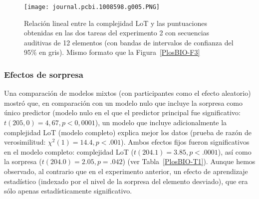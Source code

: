 \begin{figure}[t!]
   \texttt{[image: journal.pcbi.1008598.g005.PNG]}
   \centering
   \caption{Relación lineal entre la complejidad LoT y las puntuaciones obtenidas en las dos tareas del experimento 2 con secuencias auditivas de 12 elementos (con bandas de intervalos de confianza del 95\% en gris). Mismo formato que la Figura~\ref{PlosBIO-F3}}
   \label{PlosBIO-F5}
\end{figure}

\subsubsection*{Efectos de sorpresa}

Una comparación de modelos mixtos (con participantes como el efecto aleatorio)  mostró que, en comparación con un modelo nulo que incluye la sorpresa como único predictor (modelo nulo en el que el predictor principal fue significativo: $t (205,0) = 4,67, p <0,0001$), un modelo que incluye adicionalmente la complejidad LoT (modelo completo) explica mejor los datos (prueba de razón de verosimilitud: $\chi^2(1) = 14.4, p < .001$). Ambos efectos fijos fueron significativos en el modelo completo: complejidad LoT ($t (204.1) = 3.85, p < .0001$), así como la sorpresa ($t (204.0) = 2.05, p= .042$) (ver Tabla~\ref{PlosBIO-T1}). Aunque hemos observado, al contrario que en el experimento anterior, un efecto de aprendizaje estadístico (indexado por el nivel de la sorpresa del elemento desviado), que era sólo apenas estadísticamente significativo.

